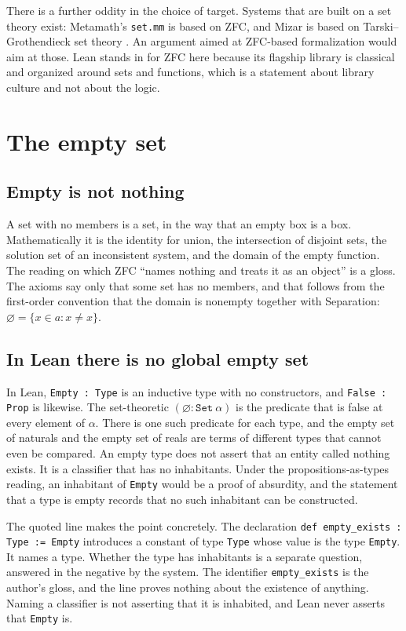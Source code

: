 \documentclass[11pt]{article}
\begin{document}
There is a further oddity in the choice of target. Systems that are built on a set theory exist: Metamath's \texttt{set.mm} is based on ZFC, and Mizar is based on Tarski--Grothendieck set theory \cite{megill2019}. An argument aimed at ZFC-based formalization would aim at those. Lean stands in for ZFC here because its flagship library is classical and organized around sets and functions, which is a statement about library culture and not about the logic.

\section{The empty set}

\subsection{Empty is not nothing}

A set with no members is a set, in the way that an empty box is a box. Mathematically it is the identity for union, the intersection of disjoint sets, the solution set of an inconsistent system, and the domain of the empty function. The reading on which ZFC ``names nothing and treats it as an object'' is a gloss. The axioms say only that some set has no members, and that follows from the first-order convention that the domain is nonempty together with Separation: $\varnothing=\{x\in a: x\neq x\}$.

\subsection{In Lean there is no global empty set}

In Lean, \texttt{Empty : Type} is an inductive type with no constructors, and \texttt{False : Prop} is likewise. The set-theoretic $(\varnothing : \mathtt{Set}\ \alpha)$ is the predicate that is false at every element of $\alpha$. There is one such predicate for each type, and the empty set of naturals and the empty set of reals are terms of different types that cannot even be compared. An empty type does not assert that an entity called nothing exists. It is a classifier that has no inhabitants. Under the propositions-as-types reading, an inhabitant of \texttt{Empty} would be a proof of absurdity, and the statement that a type is empty records that no such inhabitant can be constructed.

The quoted line makes the point concretely. The declaration \texttt{def empty\_exists : Type := Empty} introduces a constant of type \texttt{Type} whose value is the type \texttt{Empty}. It names a type. Whether the type has inhabitants is a separate question, answered in the negative by the system. The identifier \texttt{empty\_exists} is the author's gloss, and the line proves nothing about the existence of anything. Naming a classifier is not asserting that it is inhabited, and Lean never asserts that \texttt{Empty} is.
\end{document}
